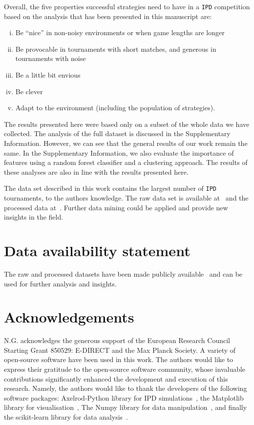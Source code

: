 \documentclass{article}
\def\IPD{\texttt{IPD}}
\begin{document}
Overall, the five properties successful strategies need to have in a \IPD{} competition
based on the analysis that has been presented in this manuscript are:

\begin{enumerate}[(i)]
    \item Be ``nice'' in non-noisy environments or when game lengths are longer
    \item Be provocable in tournaments with short matches, and generous in tournaments with noise
    \item Be a little bit envious
    \item Be clever
    \item Adapt to the environment (including the population of strategies).
\end{enumerate}

The results presented here were based only on a subset of the whole data we have
collected. The analysis of the full dataset is discussed in the Supplementary Information.
However, we can see that the general results of our work remain the same. In the
Supplementary Information, we also evaluate the importance of features using a
random forest classifier and a clustering approach. The results of these
analyses are also in line with the results presented here.

The data set described in this work contains the largest number of \IPD{}
tournaments, to the authors knowledge. The raw data set is available
at~\cite{raw_data} and the processed data at~\cite{data}. Further data mining
could be applied and provide new insights in the field.

\section{Data availability statement}

The raw and processed datasets have been made publicly available~\cite{data,
raw_data} and can be used for further analysis and insights.

\section{Acknowledgements}

N.G. acknowledges the generous support of the European Research Council Starting
Grant 850529: E-DIRECT and the Max Planck Society.
A variety of open-source software have been used in this work. The authors would
like to express their gratitude to the open-source software community, whose
invaluable contributions significantly enhanced the development and execution of
this research. Namely, the authors would like to thank the developers of the
following software packages: Axelrod-Python library for IPD
simulations~\cite{axelrodproject}, the Matplotlib library for
visualisation~\cite{hunter2007matplotlib}, The Numpy library for data
manipulation~\cite{walt2011numpy}, and finally the scikit-learn library for data
analysis~\cite{scikit-learn}.



\end{document}
